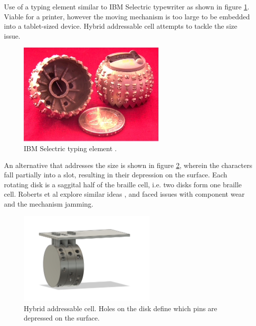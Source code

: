 Use of a typing element similar to IBM Selectric typewriter as shown in figure \ref{fig:IBM_Selectric_Globe_Wiki.jpg}. Viable for a printer, however the moving mechanism is too large to be embedded into a tablet-sized device. Hybrid addressable cell attempts to tackle the size issue.
\begin{figure}
\centering
    \includegraphics[height=5cm]{figures/IBM_Selectric_Globe_Wiki.jpg}
\caption[IBM Selectric typing element]{IBM Selectric typing element \cite{wiki:IBMSelectric}.}
\label{fig:IBM_Selectric_Globe_Wiki.jpg}
\end{figure}

An alternative that addresses the size is shown in figure \ref{fig:rotation.png}, wherein the characters fall partially into a slot, resulting in their depression on the surface. Each rotating disk is a saggital half of the braille cell, i.e. two disks form one braille cell. Roberts et al explore similar ideas \cite{roberts_492_2000}, and faced issues with component wear and the mechanism jamming.

\begin{figure}
\centering
    \includegraphics[width=0.6\textwidth]{figures/rotation.png}
\caption{Hybrid addressable cell. Holes on the disk define which pins are depressed on the surface.}
\label{fig:rotation.png}
\end{figure}